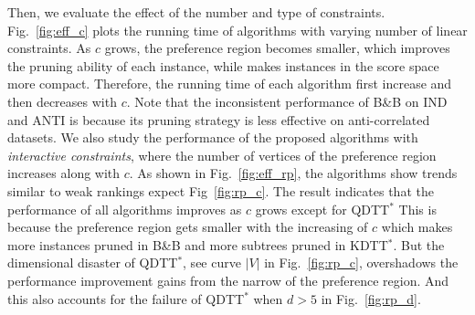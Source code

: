 \begin{figure*}[t]
	\begin{minipage}{.39\textwidth}
        \centering
		\caption{Effect of $c$ on running time for linear constraints.}
		\label{fig:eff_c}
	\end{minipage}
	\begin{minipage}{.6\textwidth}
        \centering
		\caption{Running time under interactive constraints (\textsc{IND}).}
		\label{fig:eff_rp}
	\end{minipage}
\end{figure*}


Then, we evaluate the effect of the number and type of constraints.
Fig.~\ref{fig:eff_c} plots the running time of algorithms with varying number of linear constraints.
As $c$ grows, the preference region becomes smaller, which improves the pruning ability of each instance, while makes instances in the score space more compact.
Therefore, the running time of each algorithm first increase and then decreases with $c$.
Note that the inconsistent performance of \textsc{B\&B} on \textsc{IND} and \textsc{ANTI} is because its pruning strategy is less effective on anti-correlated datasets.
We also study the performance of the proposed algorithms with \textit{interactive constraints}, where the number of vertices of the preference region increases along with $c$.
As shown in Fig.~\ref{fig:eff_rp}, the algorithms show trends similar to weak rankings expect Fig~\ref{fig:rp_c}.
The result indicates that the performance of all algorithms improves as $c$ grows except for \textsc{QDTT$^*$} 
This is because the preference region gets smaller with the increasing of $c$ which makes more instances pruned in \textsc{B\&B} and more subtrees pruned in \textsc{KDTT$^*$}.
But the dimensional disaster of \textsc{QDTT$^*$}, see curve $|V|$ in Fig.~\ref{fig:rp_c}, overshadows the performance improvement gains from the narrow of the preference region.
And this also accounts for the failure of \textsc{QDTT$^*$} when $d > 5$ in Fig.~\ref{fig:rp_d}.

